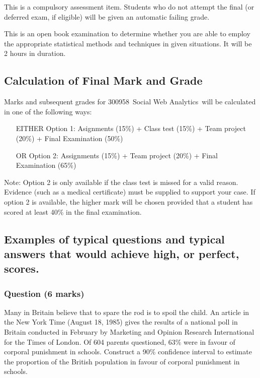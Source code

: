 \documentclass[a4paper,oneside]{book}
\newcommand{\unitcode}{300958}
\newcommand{\unitname}{Social Web Analytics}
\begin{document}
This is a compulsory assessment item. Students who do not attempt the final (or deferred
exam, if eligible) will be given an automatic failing grade.

This is an open book examination to determine whether you are able to employ the appropriate
statistical methods and techniques in given situations. It will be 2 hours in duration.


\subsection*{Calculation of Final Mark and Grade}




Marks and subsequent grades for \unitcode~\unitname~will be
calculated in one of the following ways:
\begin{itemize}
\item[EITHER]
  Option 1: Asignments (15\%) + Class test (15\%) + Team project (20\%) + Final
  Examination (50\%)
\item[OR]
  Option 2: Assignments (15\%) + Team project (20\%) + Final Examination (65\%)
\end{itemize}
Note: Option 2 is only available if the class test is missed for a
valid reason. Evidence (such as a medical certificate) must be
supplied to support your case.  If option 2 is available, the higher
mark will be chosen provided that a student has scored at least 40\%
in the final examination.



\subsection*{Examples of typical questions and typical answers that
  would achieve high, or perfect, scores.}

\subsubsection*{Question (6 marks)}

Many in Britain believe that to spare the rod is to spoil the
child. An article in the New York Time (August 18, 1985) gives the
results of a national poll in Britain conducted in February by
Marketing and Opinion Research International for the Times of
London. Of 604 parents questioned, 63\% were in favour of corporal
punishment in schools. Construct a 90\% confidence interval to
estimate the proportion of the British population in favour of
corporal punishment in schools.
\end{document}
